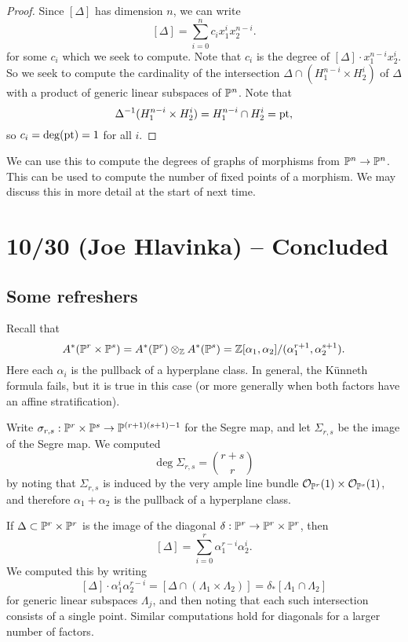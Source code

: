 \documentclass{article}
\begin{document}
\begin{proof}
	Since $[\Delta]$ has dimension $n$, we can write
	\[
		[\Delta] = \sum_{i=0}^n c_i x_1^i x_2^{n-i}.
	\]
	for some $c_i$ which we seek to compute.
	Note that $c_i$ is the degree of $[\Delta] \cdot x_1^{n-i} x_2^i$.
	So we seek to compute the cardinality of the intersection $\Delta \cap (H_1^{n-i} \times H_2^i)$ of $\Delta$ with a product of generic linear subspaces of $\mathbb{P}^n$.
	Note that 
	\[
		\Delta^{-1}(H_1^{n-i} \times H_2^i) = H_1^{n-i} \cap H_2^i = \operatorname{pt},
	\]
	so $c_i = \deg(\operatorname{pt}) = 1$ for all $i$.
\end{proof}

We can use this to compute the degrees of graphs of morphisms from $\mathbb{P}^n \to \mathbb{P}^n$.
This can be used to compute the number of fixed points of a morphism.
We may discuss this in more detail at the start of next time.

\section{10/30 (Joe Hlavinka) -- Concluded}

\subsection{Some refreshers}

Recall that
\[
	A^*(\mathbb{P}^r \times \mathbb{P}^s) = A^*(\mathbb{P}^r) \otimes_{\mathbb{Z}} A^*(\mathbb{P}^s) = \mathbb{Z}[\alpha_1, \alpha_2] / (\alpha_1^{r+1}, \alpha_2^{s+1}).
\]
Here each $\alpha_i$ is the pullback of a hyperplane class.
In general, the K\"unneth formula fails, but it is true in this case (or more generally when both factors have an affine stratification).

Write $\sigma_{r,s}: \mathbb{P}^r \times \mathbb{P}^s \to \mathbb{P}^{(r+1)(s+1)-1}$ for the Segre map, and let $\Sigma_{r,s}$ be the image of the Segre map.
We computed
\[
	\deg \Sigma_{r,s} = \binom{r+s}{r}
\]
by noting that $\Sigma_{r,s}$ is induced by the very ample line bundle $\mathcal{O}_{\mathbb{P}^r}(1) \times \mathcal{O}_{\mathbb{P}^s}(1)$, and therefore $\alpha_1 + \alpha_2$ is the pullback of a hyperplane class.

If $\Delta \subset \mathbb{P}^r \times \mathbb{P}^r$ is the image of the diagonal $\delta: \mathbb{P}^r \to \mathbb{P}^r \times \mathbb{P}^r$, then
\[
	[\Delta] = \sum_{i=0}^r \alpha_1^{r-i} \alpha_2^i.
\]
We computed this by writing 
\[
	[\Delta] \cdot \alpha_1^i \alpha_2^{r-i} = [\Delta \cap (\Lambda_1 \times \Lambda_2)] = \delta_* [\Lambda_1 \cap \Lambda_2]
\]
for generic linear subspaces $\Lambda_j$, and then noting that each such intersection consists of a single point.
Similar computations hold for diagonals for a larger number of factors.
\end{document}
